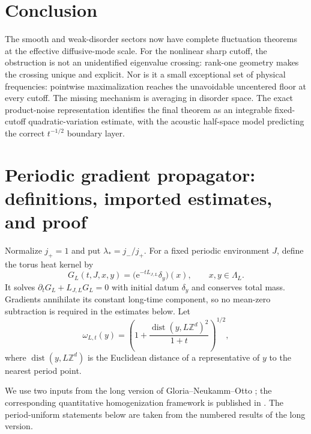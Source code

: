 \documentclass[11pt]{article}
\theoremstyle{definition}
\theoremstyle{remark}
\newcommand{\e}{\mathrm e}
\newcommand{\Z}{\mathbb Z}
\newcommand{\dist}{\operatorname{dist}}
\begin{document}
\section{Conclusion}

The smooth and weak-disorder sectors now have complete fluctuation theorems at the effective diffusive-mode scale.  For the nonlinear sharp cutoff, the obstruction is not an unidentified eigenvalue crossing: rank-one geometry makes the crossing unique and explicit.  Nor is it a small exceptional set of physical frequencies: pointwise maximalization reaches the unavoidable uncentered floor at every cutoff.  The missing mechanism is averaging in disorder space.  The exact product-noise representation identifies the final theorem as an integrable fixed-cutoff quadratic-variation estimate, with the acoustic half-space model predicting the correct $t^{-1/2}$ boundary layer.


\appendix

\section{Periodic gradient propagator: definitions, imported estimates, and proof}
\label{app:gradient-propagator}

Normalize $j_+=1$ and put $\lambda_*=j_-/j_+$.  For a fixed periodic environment $J$, define the torus heat kernel by
\begin{equation}
 G_L(t,J,x,y)=\bigl(\e^{-tL_{J,L}}\delta_y\bigr)(x),
 \qquad x,y\in\Lambda_L.
 \label{eq:torus-Green-definition}
\end{equation}
It solves $\partial_tG_L+L_{J,L}G_L=0$ with initial datum $\delta_y$ and conserves total mass.  Gradients annihilate its constant long-time component, so no mean-zero subtraction is required in the estimates below.  Let
\begin{equation}
 \omega_{L,t}(y)=\left(1+\frac{\dist(y,L\Z^d)^2}{1+t}\right)^{1/2},
 \label{eq:GNO-weight-definition}
\end{equation}
where $\dist(y,L\Z^d)$ is the Euclidean distance of a representative of $y$ to the nearest period point.

We use two inputs from the long version of Gloria--Neukamm--Otto \cite{GloriaNeukammOtto2013Long}; the corresponding quantitative homogenization framework is published in \cite{GloriaNeukammOtto2015}.  The period-uniform statements below are taken from the numbered results of the long version.
\end{document}
